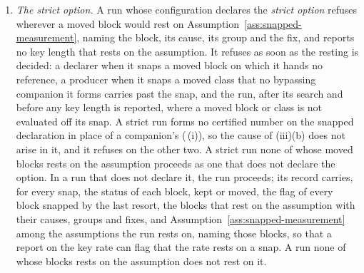 \begin{requirement}
\begin{enumerate}[label=(\roman*),leftmargin=2.4em]
\begin{enumerate}[label=(\alph*),leftmargin=2.0em]
    no companion carrying the reference on the block, or bypassing the class,
    is evaluated, because none is formed, compiled or admitted. The fix is
    the one the reason recorded for the companion names.
  \end{enumerate}
\item \emph{The strict option.} A run whose configuration declares the
  \emph{strict option}  refuses wherever a moved
  block would rest on Assumption~\ref{ass:snapped-measurement}, naming the
  block, its cause, its group and the fix, and reports no key length that
  rests on the assumption. It refuses as soon as the resting is decided: a
  declarer when it snaps a moved block on which it hands no reference, a
  producer when it snaps a moved class that no bypassing companion it forms
  carries past the snap, and the run, after its search and before any key
  length is reported, where a moved block or class is not evaluated off its
  snap. A strict run forms no certified number on the snapped declaration in
  place of a companion's
  (\,(i)), so the
  cause  of (iii)(b) does not arise in it,
  and it refuses on the other two. A strict run none of whose
  moved blocks rests on the assumption proceeds as one that does not declare
  the option. In a run that does not declare it, the run proceeds; its record
  carries, for every snap, the status of each block, kept or moved, the flag
  of every block snapped by the last resort, the blocks that rest on the
  assumption with their causes, groups and fixes, and
  Assumption~\ref{ass:snapped-measurement} among the assumptions the run
  rests on, naming those blocks, so that a report on the key rate can flag
  that the rate rests on a snap. A run none of whose blocks rests on the
  assumption does not rest on it.
\end{enumerate}
\end{requirement}
